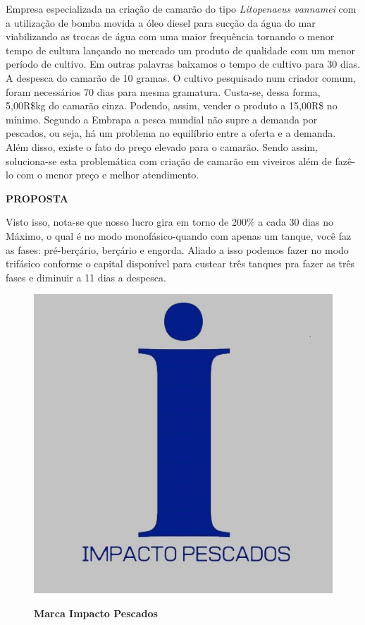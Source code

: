 Empresa especializada na criação de camarão do tipo \textit{Litopenaeus vannamei} com a utilização de bomba movida a óleo diesel para sucção da água do mar viabilizando as trocas de água com uma maior frequência tornando o menor tempo de cultura lançando no mercado um produto de qualidade com um menor período de cultivo. Em outras palavras baixamos o tempo de cultivo para 30 dias. A despesca do camarão de 10 gramas. O cultivo pesquisado num criador comum, foram necessários 70 dias para mesma gramatura. Custa-se, dessa forma, 5,00R\$kg do camarão cinza. Podendo, assim, vender o produto a 15,00R\$ no mínimo. Segundo a Embrapa a pesca mundial não supre a demanda por pescados, ou seja, há um problema no equilíbrio entre a oferta e a demanda. Além disso, existe o fato do preço elevado para o camarão. Sendo assim, soluciona-se esta problemática com criação de camarão em viveiros além de fazê-lo com o menor preço e melhor atendimento.

\textbf{PROPOSTA}

Visto isso, nota-se que nosso lucro gira em torno de 200\% a cada 30 dias no Máximo, o qual é no modo monofásico-quando com apenas um tanque, você faz as fases: pré-berçário, berçário e engorda. Aliado a isso podemos fazer no modo trifásico conforme o capital disponível para custear três tanques pra fazer as três fases e diminuir a 11 dias a despesca.

\begin{figure}[!htb]
\centering
\caption{\textbf{Marca Impacto Pescados}}
\includegraphics[scale=0.4]{Imagens/imacto_pescados.jpg}
\label{figura_23}
\end{figure}
\newpage


